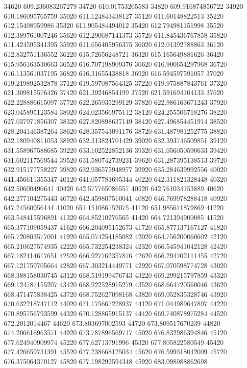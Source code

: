 {34620 609.236083267279
34720 610.01753205583
34820 609.916874856722
34920 610.186095765759
35020 611.124843438127
35120 611.60148822513
35220 612.15498959986
35320 611.905484494012
35420 612.794981151998
35520 612.389761007246
35620 612.290687141373
35720 611.845436767858
35820 611.424595341395
35920 611.656405956375
36020 612.01392788863
36120 612.832751136552
36220 615.72656248721
36320 615.165649881626
36420 615.956163530663
36520 616.707198909376
36620 616.900654297968
36720 616.113561037195
36820 616.31655438818
36920 616.594597591057
37020 619.219892532878
37120 619.597087564325
37220 619.975887843761
37320 621.309815576426
37420 621.39246854199
37520 621.591694104133
37620 622.228886615097
37720 622.265935299129
37820 622.986163671243
37920 623.045895123584
38020 624.023566975112
38120 624.255506718276
38220 627.037971856307
38320 627.820898637149
38420 627.496854451914
38520 628.204146387264
38620 628.357543091176
38720 631.487981252775
38820 632.180940811053
38920 632.313824701429
39020 632.393746509851
39120 631.558967588685
39220 633.102522852136
39320 631.056050590633
39420 631.602117569544
39520 631.580742739231
39620 631.287395138513
39720 632.915177758227
39820 632.936575948977
39920 635.284639992556
40020 641.456611355347
40120 641.057783695344
40220 642.311821328448
40320 642.50600496641
40420 642.577765086557
40520 642.761034153889
40620 642.277104275443
40720 642.459807510041
40820 646.769978288418
40920 647.24560956144
41020 651.151086152075
41120 651.985671879869
41220 663.548415596891
41320 664.85210276565
41420 664.721394900085
41520 665.377109059437
41620 666.204095152673
41720 665.877137167127
41820 665.720803577001
41920 665.074254185082
42020 664.756200060602
42120 665.210627574935
42220 665.732254238324
42320 666.545941042128
42420 667.182414617651
42520 666.927762357876
42620 666.294702111455
42720 667.121759705664
42820 667.303214449771
42920 667.070598774728
43020 668.388158030745
43120 668.519199476743
43220 669.299215797859
43320 669.124787155207
43420 668.922528915279
43520 668.664720560046
43620 668.471475838425
43720 668.752627098168
43820 669.052835328746
43920 670.632218747112
44020 671.175667228937
44120 671.044989647897
44220 670.895756793599
44320 670.128865915137
44420 669.740878975284
44520 672.2012014467
44620 673.803697002593
44720 673.809517670239
44820 674.206616963571
44920 673.787896569717
45020 676.832986394846
45120 677.624940909974
45220 677.62713791996
45320 677.805822580549
45420 677.426659731391
45520 677.238668125034
45620 676.599318042009
45720 676.375064370127
45820 677.198292594348
45920 683.098088862698
}
